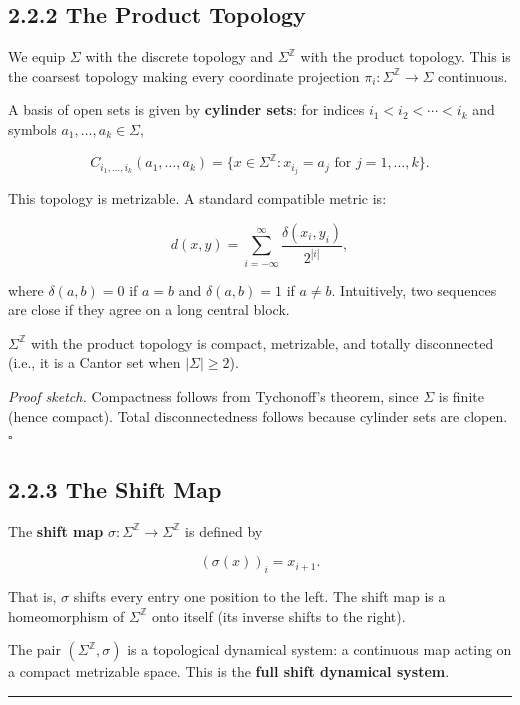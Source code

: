 \subsection{2.2.2 The Product Topology}

We equip $\Sigma$ with the discrete topology and $\Sigma^{\mathbb{Z}}$ with the product topology. This is the coarsest topology making every coordinate projection $\pi_i : \Sigma^{\mathbb{Z}} \to \Sigma$ continuous.

A basis of open sets is given by \textbf{cylinder sets}: for indices $i_1 < i_2 < \cdots < i_k$ and symbols $a_1, \ldots, a_k \in \Sigma$,

\[
C_{i_1, \ldots, i_k}(a_1, \ldots, a_k) = \{ x \in \Sigma^{\mathbb{Z}} : x_{i_j} = a_j \text{ for } j = 1, \ldots, k \} .
\]

This topology is metrizable. A standard compatible metric is:

\[
d(x, y) = \sum_{i = -\infty}^{\infty} \frac{\delta(x_i, y_i)}{2^{|i|}},
\]

where $\delta(a, b) = 0$ if $a = b$ and $\delta(a, b) = 1$ if $a \neq b$. Intuitively, two sequences are close if they agree on a long central block.

\begin{proposition}
$\Sigma^{\mathbb{Z}}$ with the product topology is compact, metrizable, and totally disconnected (i.e., it is a Cantor set when $|\Sigma| \geq 2$).

\textit{Proof sketch.} Compactness follows from Tychonoff's theorem, since $\Sigma$ is finite (hence compact). Total disconnectedness follows because cylinder sets are clopen. $\square$
\end{proposition}

\subsection{2.2.3 The Shift Map}

\begin{definition}
The \textbf{shift map} $\sigma : \Sigma^{\mathbb{Z}} \to \Sigma^{\mathbb{Z}}$ is defined by

\[
(\sigma(x))_i = x_{i+1}.
\]

That is, $\sigma$ shifts every entry one position to the left. The shift map is a homeomorphism of $\Sigma^{\mathbb{Z}}$ onto itself (its inverse shifts to the right).

The pair $(\Sigma^{\mathbb{Z}}, \sigma)$ is a topological dynamical system: a continuous map acting on a compact metrizable space. This is the \textbf{full shift dynamical system}.

\bigskip\hrule\bigskip
\end{definition}

